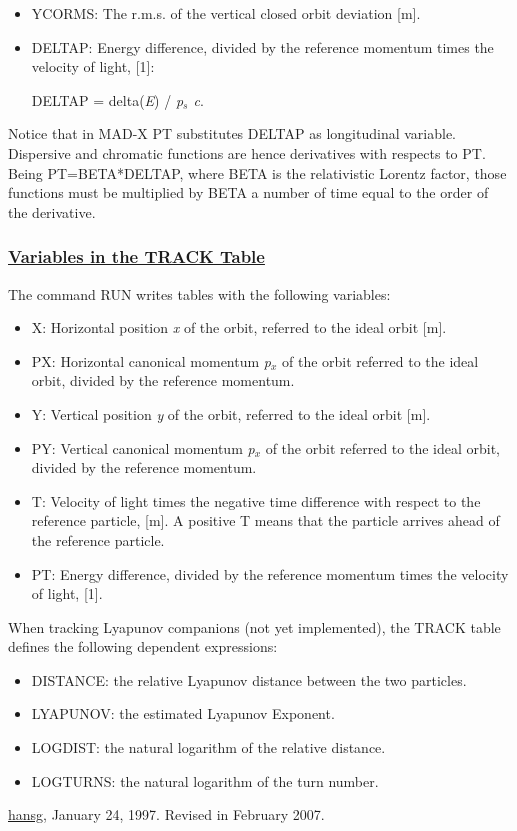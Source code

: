 \begin{itemize}
	\item YCORMS: The r.m.s. of the vertical closed orbit deviation [m].     


	\item DELTAP: Energy difference, divided by the reference momentum times the velocity of light, [1]:     

DELTAP = delta(\textit{E}) / \textit{p$_s$ c}.
\end{itemize} Notice that in MAD-X PT substitutes DELTAP as longitudinal variable. Dispersive and chromatic functions are hence derivatives with respects to PT. Being PT=BETA*DELTAP, where BETA is the relativistic Lorentz factor, those functions must be multiplied by BETA a number of time equal to the order of the derivative. 

\subsubsection{\href{track}{Variables in the TRACK Table}} The command RUN writes tables with the following variables: 
\begin{itemize}
	\item X: Horizontal position \textit{x} of the orbit, referred to the ideal orbit [m].   
	\item PX: Horizontal canonical momentum \textit{p$_x$} of the orbit referred to the ideal orbit, divided by the reference momentum.   
	\item Y: Vertical position \textit{y} of the orbit, referred to the ideal orbit [m].   
	\item PY: Vertical canonical momentum \textit{p$_x$} of the orbit referred to the ideal orbit, divided by the reference momentum.   
	\item T: Velocity of light times the negative time difference with respect to the reference particle, [m]. A positive T means that the particle arrives ahead of the reference particle.   
	\item PT: Energy difference, divided by the reference momentum times the velocity of light, [1].   
\end{itemize} When tracking Lyapunov companions (not yet implemented), the TRACK table defines the following dependent expressions: 
\begin{itemize}
	\item DISTANCE: the relative Lyapunov distance between the two particles.   
	\item LYAPUNOV: the estimated Lyapunov Exponent.   
	\item LOGDIST: the natural logarithm of the relative distance.   
	\item LOGTURNS: the natural logarithm of the turn number.   
\end{itemize}\href{http://www.cern.ch/Hans.Grote/hansg_sign.html}{hansg}, January 24, 1997. Revised in February 2007.
\\

